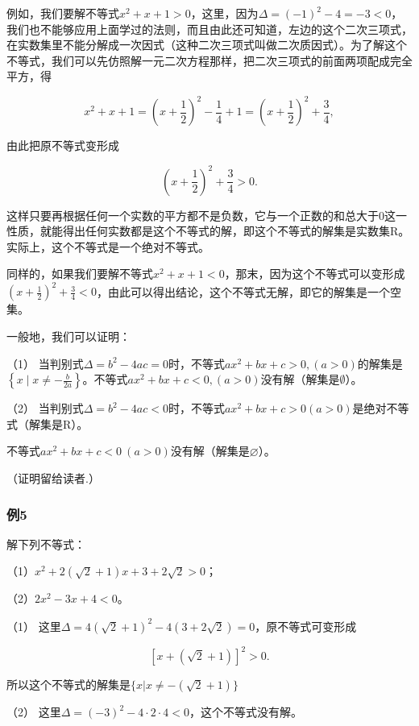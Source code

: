 例如，我们要解不等式\(x^{2} + x + 1 > 0\)，这里，因为\(\Delta = (-1)^{2} - 4 = -3 < 0\)，我们也不能够应用上面学过的法则，而且由此还可知道，左边的这个二次三项式，在实数集里不能分解成一次因式（这种二次三项式叫做二次质因式）。为了解这个不等式，我们可以先仿照解一元二次方程那样，把二次三项式的前面两项配成完全平方，得

\[
x^{2} + x + 1 = \left(x + \frac{1}{2}\right)^{2} - \frac{1}{4} + 1 = \left(x + \frac{1}{2}\right)^{2} + \frac{3}{4},
\]

由此把原不等式变形成

\[
\left(x + \frac{1}{2}\right)^{2} +\frac{3}{4}>0.
\]

这样只要再根据任何一个实数的平方都不是负数，它与一个正数的和总大于0这一性质，就能得出任何实数都是这个不等式的解，即这个不等式的解集是实数集R。实际上，这个不等式是一个绝对不等式。

同样的，如果我们要解不等式\(x^{2} + x + 1 < 0\)，那末，因为这个不等式可以变形成\(\left(x + \frac{1}{2}\right)^2 +\frac{3}{4} < 0\)，由此可以得出结论，这个不等式无解，即它的解集是一个空集。

一般地，我们可以证明：

（1）
当判别式\(\Delta = b^{2} - 4ac = 0\)时，不等式\(ax^2 + bx + c > 0, (a > 0)\)的解集是\(\left\{x \mid x \neq -\frac{b}{2a}\right\}\)。不等式\(ax^2 + bx + c < 0, (a > 0)\)没有解（解集是\(\emptyset\)）。

（2）
当判别式\(\Delta = b^{2} - 4ac < 0\)时，不等式\(ax^2 + bx + c > 0 (a > 0)\)是绝对不等式（解集是R）。

不等式\(ax^2+bx+c<0\ (a>0)\)没有解（解集是\(\varnothing\)）。

（证明留给读者.）

\subsubsection{例5}

解下列不等式：

（1）\(x^{2}+2(\sqrt{2}+1)x+3+2\sqrt{2}>0\)；

（2）\(2x^{2}-3x+4<0\)。

 （1）
这里\(\Delta = 4(\sqrt{2} + 1)^2 - 4(3 + 2\sqrt{2}) = 0\)，原不等式可变形成

\[
[ x + (\sqrt{2} + 1) ]^{2} > 0.
\]

所以这个不等式的解集是\(\{x|x\neq -(\sqrt{2} +1)\}\)

（2）
这里\(\Delta = (-3)^{2} - 4 \cdot 2 \cdot 4 < 0\)，这个不等式没有解。

